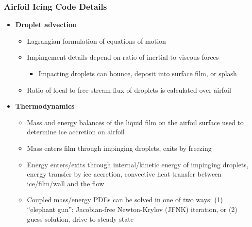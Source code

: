 \documentclass[9pt]{beamer}
\begin{document}
\begin{frame}
\frametitle{Airfoil Icing Code Details}
\label{sec-2-6}

\begin{itemize}
\item \textbf{Droplet advection}
\begin{itemize}
\item Lagrangian formulation of equations of motion
\item Impingement details depend on ratio of inertial to viscous forces
\begin{itemize}
\item Impacting droplets can bounce, deposit into surface film, or splash
\end{itemize}
\item Ratio of local to free-stream flux of droplets is calculated over airfoil
\end{itemize}
\item \textbf{Thermodynamics}
\begin{itemize}
\item Mass and energy balances of the liquid film on the airfoil surface
    used to determine ice accretion on airfoil
\item Mass enters film through impinging droplets, exits by freezing
\item Energy enters/exits through internal/kinetic energy of impinging
    droplets, energy transfer by ice accretion, convective
    heat transfer between ice/film/wall and the flow
\item Coupled mass/energy PDEs can be solved in one of two ways: (1)
    ``elephant gun'': Jacobian-free Newton-Krylov (JFNK) iteration, or
    (2) guess solution, drive to steady-state
\end{itemize}
\end{itemize}
\end{frame}
\end{document}
